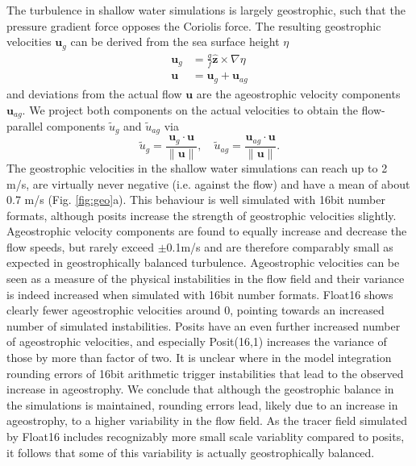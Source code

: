 \documentclass[draft]{agujournal2019}
\begin{document}
The turbulence in shallow water simulations is largely geostrophic, such that the pressure gradient force opposes the Coriolis force. The resulting geostrophic velocities $\mathbf{u}_g$ can be derived from the sea surface height $\eta$
\begin{subequations}
\begin{align}
\mathbf{u}_g &= \frac{g}{f}\hat{\mathbf{z}} \times \nabla \eta \\
\mathbf{u} &= \mathbf{u}_{g} + \mathbf{u}_{ag}
\end{align}
\label{eq:geo}%
\end{subequations}
and deviations from the actual flow $\mathbf{u}$ are the ageostrophic velocity components $\mathbf{u}_{ag}$. We project both components on the actual velocities to obtain the flow-parallel components $\tilde{u}_{g}$ and $\tilde{u}_{ag}$ via
\begin{equation}
\tilde{u}_g = \frac{\mathbf{u}_g \cdot \mathbf{u}}{\| \mathbf{u} \|}, \quad \tilde{u}_{ag} = \frac{\mathbf{u}_{ag} \cdot \mathbf{u}}{\| \mathbf{u} \|}.
\label{eq:parallel}%
\end{equation}
The geostrophic velocities in the shallow water simulations can reach up to 2 m/s, are virtually never negative (i.e. against the flow) and have a mean of about 0.7 m/s (Fig. \ref{fig:geo}a). This behaviour is well simulated with 16bit number formats, although posits increase the strength of geostrophic velocities slightly. Ageostrophic velocity components are found to equally increase and decrease the flow speeds, but rarely exceed $\pm$0.1m/s and are therefore comparably small as expected in geostrophically balanced turbulence. Ageostrophic velocities can be seen as a measure of the physical instabilities in the flow field and their variance is indeed increased when simulated with 16bit number formats. Float16 shows clearly fewer ageostrophic velocities around 0, pointing towards an increased number of simulated instabilities. Posits have an even further increased number of ageostrophic velocities, and especially Posit(16,1) increases the variance of those by more than factor of two. It is unclear where in the model integration rounding errors of 16bit arithmetic trigger instabilities that lead to the observed increase in ageostrophy. We conclude that although the geostrophic balance in the simulations is maintained, rounding errors lead, likely due to an increase in ageostrophy, to a higher variability in the flow field. As the tracer field simulated by Float16 includes recognizably more small scale variablity compared to posits, it follows that some of this variability is actually geostrophically balanced. 
\end{document}
